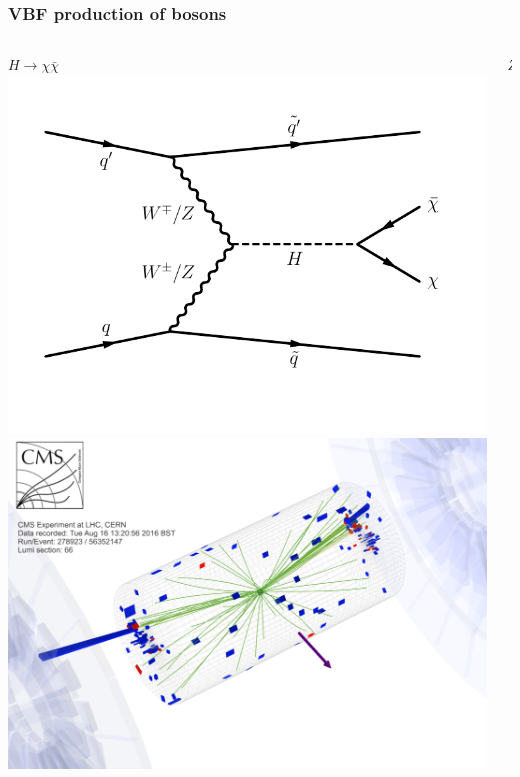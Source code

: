 \documentclass[aspectratio=169,xcolor=dvipsnames,,table,compress]{beamer}
\begin{document}
\begin{frame}   \frametitle{VBF production of bosons}
  \vspace{-5mm}
  \begin{columns}[T]
    \begin{column}{0.33\textwidth}
      \centering
      $H\rightarrow\chi\bar\chi$ \\
      \includegraphics[width=\textwidth]{../figures/vbf/diagrams/vbf_hinv.pdf} \\
      \includegraphics[width=\textwidth]{../figures/vbf/misc/event_display.png}
    \end{column}
    \begin{column}{0.33\textwidth}
      \centering 
      $Z$ \\

\end{column}
\end{columns}
\end{frame}
\end{document}
